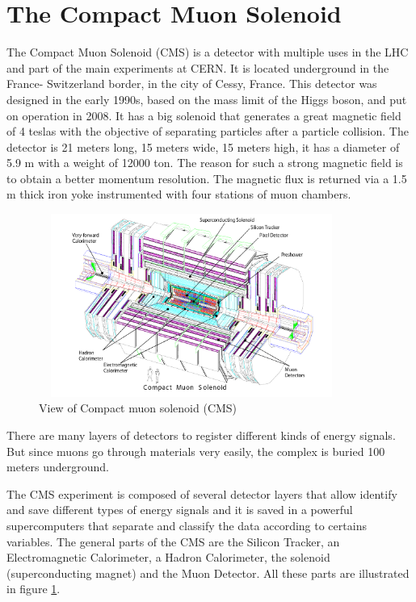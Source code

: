 \section{The Compact Muon Solenoid}	
The Compact Muon Solenoid (CMS) is a detector with multiple uses in the LHC and part of the main experiments at CERN. It is located underground in the France- Switzerland border, in the city of Cessy, France.
This detector was designed in the early 1990s, based on the mass limit of the Higgs boson, and put on operation in 2008. It has a big solenoid that generates a great magnetic field of 4 teslas with the objective of separating particles after a particle collision.
 The detector is 21 meters long, 15 meters wide, 15 meters high, it has a diameter of 5.9 m with a weight of 12000 ton. The reason for such a strong magnetic field is to obtain a better momentum resolution.
 The magnetic flux is returned via a 1.5 m thick iron yoke instrumented with four stations of muon
 chambers. %

\begin{figure}[ht]
	\centering
	\includegraphics[width=10cm,height=6cm]{Chapter2/cms2.png}
	\caption[View of Compact muon solenoid (CMS)]{View of Compact muon solenoid (CMS)\cite{cms-manual}}\label{cms}
\end{figure}
There are many layers of detectors to register different kinds of energy signals. But since muons go through materials very easily, the complex is buried 100 meters underground. 

The CMS experiment is composed of several detector layers that allow identify and save different types of energy signals and it is saved in a powerful supercomputers that separate and classify the data according to certains variables. The general parts of the CMS are the Silicon Tracker, an Electromagnetic Calorimeter, a Hadron Calorimeter, the solenoid (superconducting magnet) and the Muon Detector. All these parts are illustrated in figure \ref{cms}.

